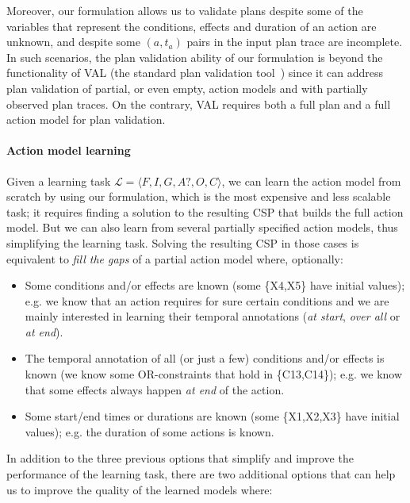 \documentclass{ecai}
\newcommand{\tup}[1]{{\langle #1 \rangle}}
\begin{document}
Moreover, our formulation allows us to validate plans despite some of the variables that represent the conditions, effects and duration of an action are unknown, and despite some $(a,t_{a})$ pairs in the input plan trace are incomplete. In such scenarios, the plan validation ability of our formulation is beyond the functionality of VAL (the standard plan validation tool~\cite{howey2004val}) since it can address plan validation of partial, or even empty, action models and with partially observed plan traces. On the contrary, VAL requires both a full plan and a full action model for plan validation.


\paragraph{Action model learning}

Given a learning task $\mathcal{L}=\tup{F,I,G,A?,O,C}$, we can learn the action model from scratch by using our formulation, which is the most expensive and less scalable task; it requires finding a solution to the resulting CSP that builds the full action model.
But we can also learn from several partially specified action models, thus simplifying the learning task. Solving the resulting CSP in those cases is equivalent to \textit{fill the gaps} of a partial action model where, optionally:

\begin{itemize}
	\item Some conditions and/or effects are known (some \{X4,X5\} have initial values); e.g. we know that an action requires for sure certain conditions and we are mainly interested in learning their temporal annotations (\textit{at start}, \textit{over all} or \textit{at end}).  
	
	\item The temporal annotation of all (or just a few) conditions and/or effects is known (we know some OR-constraints that hold in \{C13,C14\}); e.g. we know that some effects always happen \textit{at end} of the action. 
	
	\item Some start/end times or durations are known (some \{X1,X2,X3\} have initial values); e.g. the duration of some actions is known.
\end{itemize}

In addition to the three previous options that simplify and improve the performance of the learning task, there are two additional options that can help us to improve the quality of the learned models where: 
\end{document}
